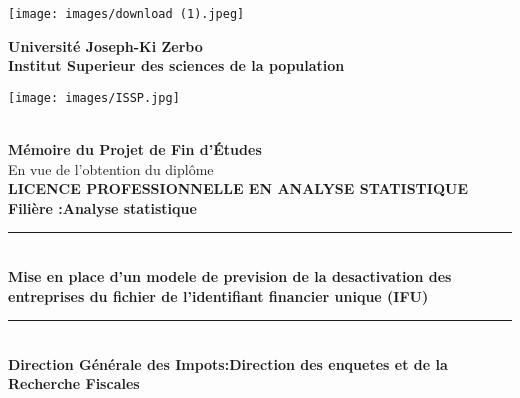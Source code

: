 \documentclass[a4paper,12pt]{report}
\begin{document}
\begin{titlepage}
\begin{center}
	\begin{minipage}{2.5cm}
	\begin{center}
		\texttt{[image: images/download (1).jpeg]}
		
	\end{center}
\end{minipage}\hfill
\begin{minipage}{10cm}
	\begin{center}
	\textbf{ Université Joseph-Ki Zerbo}\\[0.1cm]
    \textbf{\uppercase{I}nstitut Superieur des sciences de la population}\\[0.1cm]

	\end{center}
\end{minipage}\hfill
\begin{minipage}{2.5cm}
	\begin{center}
		\texttt{[image: images/ISSP.jpg]}
	\end{center}

\end{minipage}

\textsc{\Large }\\[1.5cm]
{\large \bfseries Mémoire du Projet de Fin d'\uppercase{é}tudes}\\[0.5cm]
{\large En vue de l'obtention du diplôme}\\[1cm]

{\huge \bfseries \uppercase{Licence professionnelle en analyse statistique} \\[0.5cm] }
{\large \bfseries Filière :Analyse statistique}
\textsc{\Large }\\[1cm]

\rule{\linewidth}{0.3mm} \\[0.4cm]
{ \huge \bfseries\color{blue!70!black} Mise en place d'un modele de prevision de la desactivation des entreprises du fichier de l'identifiant financier unique (IFU)\\[0.4cm] }
\rule{\linewidth}{0.3mm} \\[1cm]
{\large \bfseries Direction Générale des Impots:Direction des enquetes et de la Recherche Fiscales }\\[1cm]


\end{center}
\end{titlepage}
\end{document}

